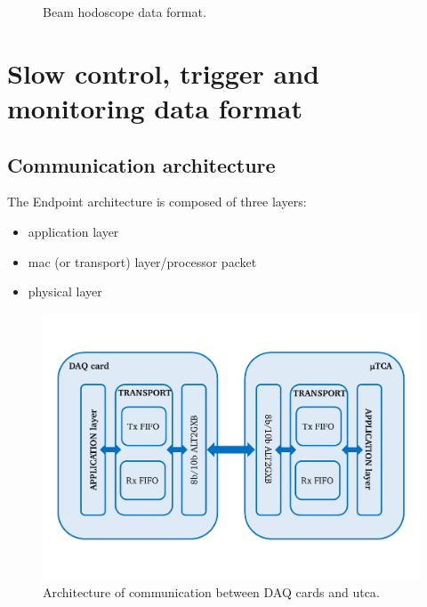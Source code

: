 \begin{figure}[htbp]
\caption{Beam hodoscope data format.}
\label{chapappA::fig::hodoDataForm}
\end{figure}


\section{Slow control, trigger and monitoring data format}\label{chapappA::sec::slowCTrigMonDataFormat}

\subsection{Communication architecture}\label{chapappA::subsec::commArch}

The Endpoint architecture is composed of three layers:
\begin{itemize}
	\item application layer
	\item mac (or transport) layer/processor packet
	\item physical layer
\end{itemize}

	\begin{figure} [!hbtp]
	\centering
	\caption{Architecture of communication between DAQ cards and \gls{utca}.}
	\label{chapappA::fig::commDAQuTCA}
	\includegraphics[width=1\textwidth]{03_GraphicFiles/appendixA_dataFormat/DAQ_uTCAImage.pdf}
	\end{figure}


